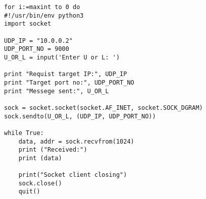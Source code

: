 \documentclass{article}
\begin{document}
\lstset{language=C++}          %


\begin{lstlisting}[frame=single]  % Start your code-block
for i:=maxint to 0 do
#!/usr/bin/env python3
import socket
 
UDP_IP = "10.0.0.2"
UDP_PORT_NO = 9000
U_OR_L = input('Enter U or L: ')

print "Requist target IP:", UDP_IP
print "Target port no:", UDP_PORT_NO
print "Messege sent:", U_OR_L
 
sock = socket.socket(socket.AF_INET, socket.SOCK_DGRAM)
sock.sendto(U_OR_L, (UDP_IP, UDP_PORT_NO))

while True:
	data, addr = sock.recvfrom(1024)
	print ("Received:")
	print (data)

	print("Socket client closing")
	sock.close()
	quit()
\end{lstlisting}
\end{document}
